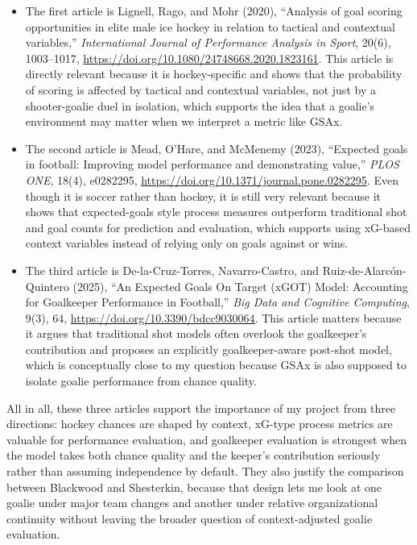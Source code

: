 \documentclass[
  10pt,
]{extarticle}
\providecommand{\tightlist}{%
  \setlength{\itemsep}{0pt}\setlength{\parskip}{0pt}}
\begin{document}
\begin{itemize}
\tightlist
\item
  The first article is Lignell, Rago, and Mohr (2020), ``Analysis of goal scoring opportunities in elite male ice hockey in relation to tactical and contextual variables,'' \textit{International Journal of Performance Analysis in Sport}, 20(6), 1003--1017, \href{https://doi.org/10.1080/24748668.2020.1823161}{https://doi.org/10.1080/24748668.2020.1823161}. This article is directly relevant because it is hockey-specific and shows that the probability of scoring is affected by tactical and contextual variables, not just by a shooter-goalie duel in isolation, which supports the idea that a goalie's environment may matter when we interpret a metric like GSAx.
\item
  The second article is Mead, O'Hare, and McMenemy (2023), ``Expected goals in football: Improving model performance and demonstrating value,'' \textit{PLOS ONE}, 18(4), e0282295, \href{https://doi.org/10.1371/journal.pone.0282295}{https://doi.org/10.1371/journal.pone.0282295}. Even though it is soccer rather than hockey, it is still very relevant because it shows that expected-goals style process measures outperform traditional shot and goal counts for prediction and evaluation, which supports using xG-based context variables instead of relying only on goals against or wins.
\item
  The third article is De-la-Cruz-Torres, Navarro-Castro, and Ruiz-de-Alarcón-Quintero (2025), ``An Expected Goals On Target (xGOT) Model: Accounting for Goalkeeper Performance in Football,'' \textit{Big Data and Cognitive Computing}, 9(3), 64, \href{https://doi.org/10.3390/bdcc9030064}{https://doi.org/10.3390/bdcc9030064}. This article matters because it argues that traditional shot models often overlook the goalkeeper's contribution and proposes an explicitly goalkeeper-aware post-shot model, which is conceptually close to my question because GSAx is also supposed to isolate goalie performance from chance quality.
\end{itemize}

All in all, these three articles support the importance of my project from three directions: hockey chances are shaped by context, xG-type process metrics are valuable for performance evaluation, and goalkeeper evaluation is strongest when the model takes both chance quality and the keeper's contribution seriously rather than assuming independence by default. They also justify the comparison between Blackwood and Shesterkin, because that design lets me look at one goalie under major team changes and another under relative organizational continuity without leaving the broader question of context-adjusted goalie evaluation.
\end{document}
